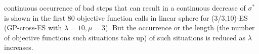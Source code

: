 continuous occurrence of bad steps that can result in a continuous decrease of $\sigma^*$ is shown in the first 80 objective function calls in linear sphere for (3/3,10)-ES (GP-cross-ES with $\lambda=10,\mu=3$). But the occurrence or the length (the number of objective functions such situations take up) of such situations is reduced as $\lambda$ increases.












